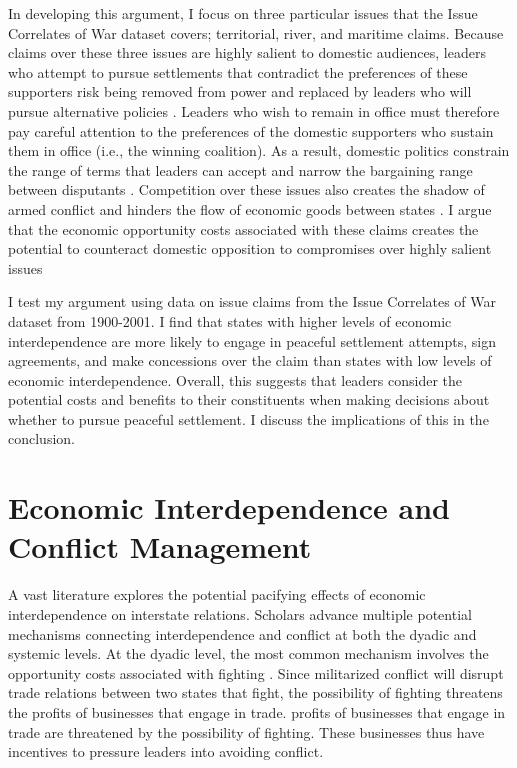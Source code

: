 In developing this argument, I focus on three particular issues that the Issue Correlates of War dataset covers; territorial, river, and maritime claims. Because claims over these three issues are highly salient to domestic audiences, leaders who attempt to pursue settlements that contradict the preferences of these supporters risk being removed from power and replaced by leaders who will pursue alternative policies \citep{bdm2003, chiozza2011, colaresi2004, vasquez2009}. Leaders who wish to remain in office must therefore pay careful attention to the preferences of the domestic supporters who sustain them in office (i.e., the winning coalition). As a result, domestic politics constrain the range of terms that leaders can accept and narrow the bargaining range between disputants \citep{fearon1994, putnam1988}. Competition over these issues also creates the shadow of armed conflict and hinders the flow of economic goods between states \citep{simmons2005}. I argue that the economic opportunity costs associated with these claims creates the potential to counteract domestic opposition to compromises over highly salient issues \citep{diehl1992, hensel2001, hensel2008, vasquez2009}


I test my argument using data on issue claims from the Issue Correlates of War dataset from 1900-2001. I find that states with higher levels of economic interdependence are more likely to engage in peaceful settlement attempts, sign agreements, and make concessions over the claim than states with low levels of economic interdependence. Overall, this suggests that leaders consider the potential costs and benefits to their constituents when making decisions about whether to pursue peaceful settlement. I discuss the implications of this in the conclusion.

\section{Economic Interdependence and Conflict Management}


A vast literature explores the potential pacifying effects of economic interdependence on interstate relations. Scholars advance multiple potential mechanisms connecting interdependence and conflict at both the dyadic and systemic levels. At the dyadic level, the most common mechanism involves the opportunity costs associated with fighting \citep[e.g.,][]{crescenzi2003a, doyle1997, polachek1980, rosecrance1986, russett2001}. Since militarized conflict will disrupt trade relations between two states that fight, the possibility of fighting threatens the profits of businesses that engage in trade. 
 profits of businesses that engage in trade are threatened by the possibility of fighting. These businesses thus have incentives to pressure leaders into avoiding conflict.

